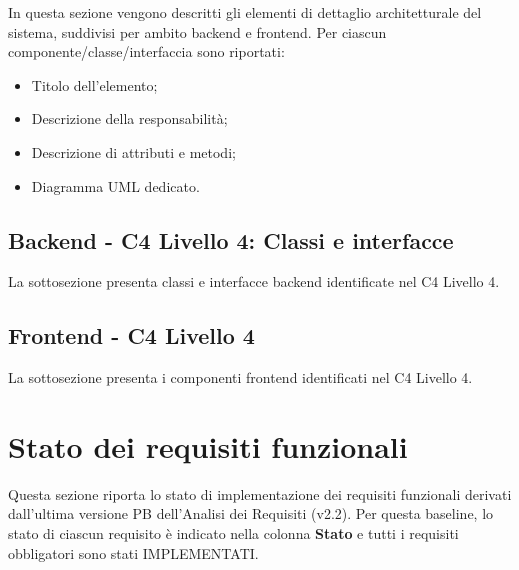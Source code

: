 \documentclass[a4paper, 11pt, oneside]{scrartcl}
\begin{document}
In questa sezione vengono descritti gli elementi di dettaglio architetturale del sistema, suddivisi per ambito backend e frontend.
Per ciascun componente/classe/interfaccia sono riportati:
\begin{itemize}
    \item Titolo dell'elemento;
    \item Descrizione della responsabilità;
    \item Descrizione di attributi e metodi;
    \item Diagramma UML dedicato.
\end{itemize}

\subsection{Backend - C4 Livello 4: Classi e interfacce}
La sottosezione presenta classi e interfacce backend identificate nel C4 Livello 4.







\subsection{Frontend - C4 Livello 4}
La sottosezione presenta i componenti frontend identificati nel C4 Livello 4.







\newpage
\section{Stato dei requisiti funzionali}

Questa sezione riporta lo stato di implementazione dei requisiti funzionali derivati dall'ultima versione PB dell'Analisi dei Requisiti (v2.2). Per questa baseline, lo stato di ciascun requisito è indicato nella colonna \textbf{Stato} e tutti i requisiti obbligatori sono stati IMPLEMENTATI.
\end{document}
